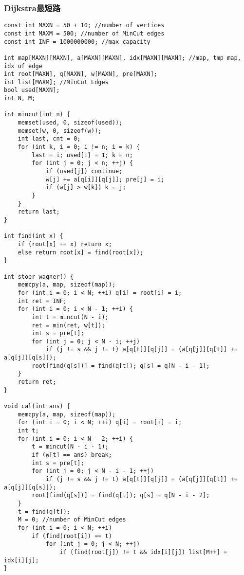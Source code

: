 \subsubsection{Dijkstra最短路}
\begin{verbatim}
const int MAXN = 50 + 10; //number of vertices
const int MAXM = 500; //number of MinCut edges
const int INF = 1000000000; //max capacity

int map[MAXN][MAXN], a[MAXN][MAXN], idx[MAXN][MAXN]; //map, tmp map, idx of edge
int root[MAXN], q[MAXN], w[MAXN], pre[MAXN];
int list[MAXM]; //MinCut Edges
bool used[MAXN];
int N, M;

int mincut(int n) {
	memset(used, 0, sizeof(used));
	memset(w, 0, sizeof(w));
	int last, cnt = 0;
	for (int k, i = 0; i != n; i = k) {
		last = i; used[i] = 1; k = n;
		for (int j = 0; j < n; ++j) {
			if (used[j]) continue;
			w[j] += a[q[i]][q[j]]; pre[j] = i;
			if (w[j] > w[k]) k = j;
		}
	}
	return last;
}

int find(int x) {
	if (root[x] == x) return x;
	else return root[x] = find(root[x]);
}

int stoer_wagner() {
	memcpy(a, map, sizeof(map));
	for (int i = 0; i < N; ++i) q[i] = root[i] = i;
	int ret = INF;
	for (int i = 0; i < N - 1; ++i) {
		int t = mincut(N - i);
		ret = min(ret, w[t]);
		int s = pre[t];
		for (int j = 0; j < N - i; ++j)
			if (j != s && j != t) a[q[t]][q[j]] = (a[q[j]][q[t]] += a[q[j]][q[s]]);
		root[find(q[s])] = find(q[t]); q[s] = q[N - i - 1]; 
	}
	return ret;
}

void cal(int ans) {
	memcpy(a, map, sizeof(map));
	for (int i = 0; i < N; ++i) q[i] = root[i] = i;
	int t;
	for (int i = 0; i < N - 2; ++i) {
		t = mincut(N - i - 1);
		if (w[t] == ans) break;
		int s = pre[t];
		for (int j = 0; j < N - i - 1; ++j)
			if (j != s && j != t) a[q[t]][q[j]] = (a[q[j]][q[t]] += a[q[j]][q[s]]);
		root[find(q[s])] = find(q[t]); q[s] = q[N - i - 2]; 
	}
	t = find(q[t]);
	M = 0; //number of MinCut edges
	for (int i = 0; i < N; ++i)
		if (find(root[i]) == t)
			for (int j = 0; j < N; ++j)
				if (find(root[j]) != t && idx[i][j]) list[M++] = idx[i][j];
}
\end{verbatim}
